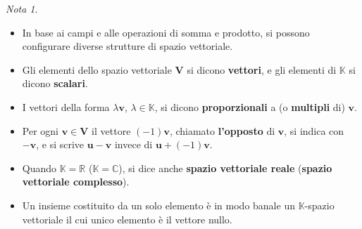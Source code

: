 \documentclass{article}
\theoremstyle{plain}
\theoremstyle{definition}
\theoremstyle{remark}
\newtheorem{note}{Nota}
\begin{document}
\begin{note}\hfill
    \begin{itemize}
        \item In base ai campi e alle operazioni di somma e prodotto, si possono configurare diverse strutture di spazio vettoriale.
        \item Gli elementi dello spazio vettoriale \( \mathbf{V} \) si dicono \textbf{vettori}, e gli elementi di \( \mathbb{K} \) si dicono \textbf{scalari}.
        \item I vettori della forma \( \lambda\mathbf{v} \), \( \lambda \in \mathbb{K} \), si dicono \textbf{proporzionali} a (o \textbf{multipli} di) \( \mathbf{v} \).
        \item Per ogni \( \mathbf{v} \in \mathbf{V} \) il vettore \( (-1)\mathbf{v} \), chiamato \textbf{l'opposto} di \( \mathbf{v} \), si indica con \( -\mathbf{v} \), e si scrive \( \mathbf{u} - \mathbf{v} \) invece di \( \mathbf{u} + (-1)\mathbf{v} \).
        \item Quando \( \mathbb{K} = \mathbb{R} \) (\( \mathbb{K} = \mathbb{C} \)), si dice anche \textbf{spazio vettoriale reale} (\textbf{spazio vettoriale complesso}).
        \item Un insieme costituito da un solo elemento è in modo banale un $\mathbb{K}$-spazio vettoriale il cui unico elemento è il vettore nullo.
    \end{itemize}    
\end{note}

\vspace{10pt}
\end{document}
